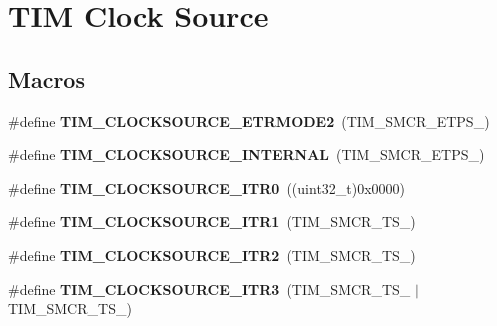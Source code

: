 \hypertarget{group___t_i_m___clock___source}{}\section{T\+IM Clock Source}
\label{group___t_i_m___clock___source}
\subsection*{Macros}
\begin{DoxyCompactItemize}
\item 
\mbox{\label{group___t_i_m___clock___source_gab133f0839cf6a4e858457d48f057eea8}} 
\#define {\bfseries T\+I\+M\+\_\+\+C\+L\+O\+C\+K\+S\+O\+U\+R\+C\+E\+\_\+\+E\+T\+R\+M\+O\+D\+E2}~(T\+I\+M\+\_\+\+S\+M\+C\+R\+\_\+\+E\+T\+P\+S\+\_)
\item 
\mbox{\label{group___t_i_m___clock___source_ga9b398a201d8b6a4f200ebde86b1d8f3a}} 
\#define {\bfseries T\+I\+M\+\_\+\+C\+L\+O\+C\+K\+S\+O\+U\+R\+C\+E\+\_\+\+I\+N\+T\+E\+R\+N\+AL}~(T\+I\+M\+\_\+\+S\+M\+C\+R\+\_\+\+E\+T\+P\+S\+\_)
\item 
\mbox{\label{group___t_i_m___clock___source_ga3310aa84f2f322eb77538997c070e56a}} 
\#define {\bfseries T\+I\+M\+\_\+\+C\+L\+O\+C\+K\+S\+O\+U\+R\+C\+E\+\_\+\+I\+T\+R0}~((uint32\+\_\+t)0x0000)
\item 
\mbox{\label{group___t_i_m___clock___source_gae2da814f8d86491e7c344bb8d0f62b96}} 
\#define {\bfseries T\+I\+M\+\_\+\+C\+L\+O\+C\+K\+S\+O\+U\+R\+C\+E\+\_\+\+I\+T\+R1}~(T\+I\+M\+\_\+\+S\+M\+C\+R\+\_\+\+T\+S\+\_)
\item 
\mbox{\label{group___t_i_m___clock___source_gafb779719a41769b14303da4977f6a5f1}} 
\#define {\bfseries T\+I\+M\+\_\+\+C\+L\+O\+C\+K\+S\+O\+U\+R\+C\+E\+\_\+\+I\+T\+R2}~(T\+I\+M\+\_\+\+S\+M\+C\+R\+\_\+\+T\+S\+\_)
\item 
\mbox{\label{group___t_i_m___clock___source_ga0cce2af04ad903ba683515c3772abb27}} 
\#define {\bfseries T\+I\+M\+\_\+\+C\+L\+O\+C\+K\+S\+O\+U\+R\+C\+E\+\_\+\+I\+T\+R3}~(T\+I\+M\+\_\+\+S\+M\+C\+R\+\_\+\+T\+S\+\_ $\vert$ T\+I\+M\+\_\+\+S\+M\+C\+R\+\_\+\+T\+S\+\_)

\end{DoxyCompactItemize}
